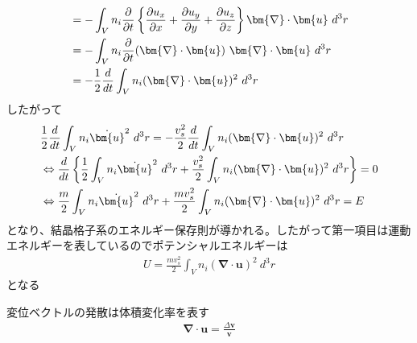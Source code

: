 \documentclass[dvipdfmx, 11pt, a4paper]{jsarticle}
\numberwithin{equation}{section}
\theoremstyle{definition}
\begin{document}
\begin{derivationBox}
\begin{align}
            &= -\int_V n_i\frac{\partial }{\partial t} \left\{ \frac{\partial u_x}{\partial x} + \frac{\partial u_y}{\partial y } + \frac{\partial u_z}{\partial z} \right\}\bm{\nabla} \cdot \bm{u}\ d^3r \notag \\
            &= -\int_V n_i\frac{\partial}{\partial t}(\bm{\nabla} \cdot \bm{u})\ \bm{\nabla} \cdot \bm{u}\ d^3r \notag \\
            &= -\frac{1}{2} \frac{d}{dt}\int_V n_i(\bm{\nabla} \cdot \bm{u})^2\ d^3r
        \end{align}
        したがって
        \begin{align}
            &\frac{1}{2}\frac{d}{dt} \int_V n_i \dot{\bm{u}}^2\ d^3r = -\frac{v_s^2}{2} \frac{d}{dt}\int_V n_i(\bm{\nabla} \cdot \bm{u})^2\ d^3r \notag \\
            &\Leftrightarrow \frac{d}{dt} \left\{ \frac{1}{2}\int_V n_i \dot{\bm{u}}^2\ d^3r + \frac{v_s^2}{2} \int_V n_i(\bm{\nabla} \cdot \bm{u})^2\ d^3r \right\} = 0 \notag \\
            &\Leftrightarrow \frac{m}{2}\int_V n_i \dot{\bm{u}}^2\ d^3r + \frac{mv_s^2}{2} \int_V n_i(\bm{\nabla} \cdot \bm{u})^2\ d^3r  = E
        \end{align}
        となり、結晶格子系のエネルギー保存則が導かれる。したがって第一項目は運動エネルギーを表しているのでポテンシャルエネルギーは
        \begin{align}
            U = \frac{mv_s^2}{2} \int_V n_i(\bm{\nabla} \cdot \bm{u})^2\ d^3r
        \end{align}
        となる
    \end{derivationBox}
    \begin{note}[]
        変位ベクトルの発散は体積変化率を表す
        \begin{align}
            \bm{\nabla} \cdot \bm{u} = \frac{\Delta \mathbf{v}}{\mathbf{v}}
        \end{align}
    \end{note}
\end{document}
